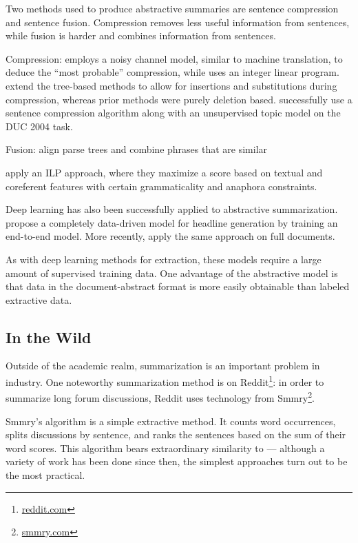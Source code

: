 \documentclass[12pt]{report}
\begin{document}
Two methods used to produce abstractive summaries are sentence compression and sentence fusion. Compression removes less useful information from sentences, while fusion is harder and combines information from sentences. %

Compression: \citet{knight2002summarization} employs a noisy channel model, similar to machine translation, to deduce the ``most probable'' compression, while \citet{clarke2008global} uses an integer linear program. \citet{cohn2008sentence} extend the tree-based methods to allow for insertions and substitutions during compression, whereas prior methods were purely deletion based. \cite{zajic2004topiary} successfully use a sentence compression algorithm along with an unsupervised topic model on the DUC 2004 task.

Fusion: align parse trees and combine phrases that are similar 

\citet{Durrett2016} apply an ILP approach, where they maximize a score based on textual and coreferent features with certain grammaticality and anaphora constraints.


Deep learning has also been successfully applied to abstractive summarization. \citet{rush2015neural} propose a completely data-driven model for headline generation by training an end-to-end model. More recently, \citet{nallapati2016seq2seq} apply the same approach on full documents.

As with deep learning methods for extraction, these models require a large amount of supervised training data. One advantage of the abstractive model is that data in the document-abstract format is more easily obtainable than labeled extractive data.


\subsection{In the Wild}

Outside of the academic realm, summarization is an important problem in industry. One noteworthy summarization method is on Reddit\footnote{\url{reddit.com}}: in order to summarize long forum discussions, Reddit uses technology from Smmry\footnote{\url{smmry.com}}.

Smmry's algorithm is a simple extractive method. It counts word occurrences, splits discussions by sentence, and ranks the sentences based on the sum of their word scores. This algorithm bears extraordinary similarity to \citet{luhn1958automatic} --- although a variety of work has been done since then, the simplest approaches turn out to be the most practical.
\end{document}

